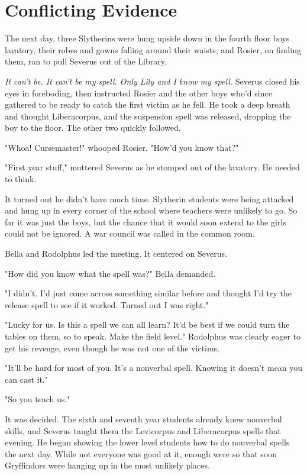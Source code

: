 
\chapter{Conflicting Evidence}

The next day, three Slytherins were hung upside down in the fourth floor boys lavatory, their robes and gowns falling around their waists, and Rosier, on finding them, ran to pull Severus out of the Library.

\emph{It can't be. It can't be my spell. Only Lily and I know my spell.} Severus closed his eyes in foreboding, then instructed Rosier and the other boys who'd since gathered to be ready to catch the first victim as he fell. He took a deep breath and thought Liberacorpus, and the suspension spell was released, dropping the boy to the floor. The other two quickly followed.

"Whoa! Cursemaster!" whooped Rosier. "How'd you know that?"

"First year stuff," muttered Severus as he stomped out of the lavatory. He needed to think.

It turned out he didn't have much time. Slytherin students were being attacked and hung up in every corner of the school where teachers were unlikely to go. So far it was just the boys, but the chance that it would soon extend to the girls could not be ignored. A war council was called in the common room.

Bella and Rodolphus led the meeting. It centered on Severus.

"How did you know what the spell was?" Bella demanded.

"I didn't. I'd just{\el} come across something similar before and thought I'd try the release spell to see if it worked. Turned out I was right."

"Lucky for us. Is this a spell we can all learn? It'd be best if we could turn the tables on them, so to speak. Make the field level." Rodolphus was clearly eager to get his revenge, even though he was not one of the victims.

"It'll be hard for most of you. It's a nonverbal spell. Knowing it doesn't mean you can cast it."

"So you teach us."

It was decided. The sixth and seventh year students already knew nonverbal skills, and Severus taught them the Levicorpus and Liberacorpus spells that evening. He began showing the lower level students how to do nonverbal spells the next day. While not everyone was good at it, enough were so that soon Gryffindors were hanging up in the most unlikely places.

